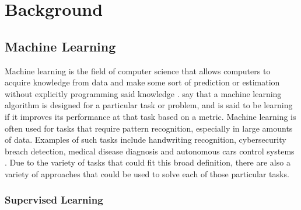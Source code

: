 \chapter{Background}
\label{bckgnd}

\section{ Machine Learning}
Machine learning is the field of computer science that allows computers to acquire knowledge from data and make some sort of prediction or estimation without explicitly programming said knowledge \cite{bishop_2013}. \citet{ai_text_book} say that a machine learning algorithm is designed for a particular task or problem, and is said to be learning if it improves its performance at that task based on a metric. Machine learning is often used for tasks that require pattern recognition, especially in large amounts of data.  Examples of such tasks include handwriting recognition, cybersecurity breach detection, medical disease diagnosis and autonomous cars control systems \cite{lecun1998mnist,cybersecurity,3d_conf_for_alzheimers,driverless_cars}. Due to the variety of tasks that could fit this broad definition, there are also a variety of approaches that could be used to solve each of those particular tasks.


\subsection{Supervised Learning}
\label{supervised}

